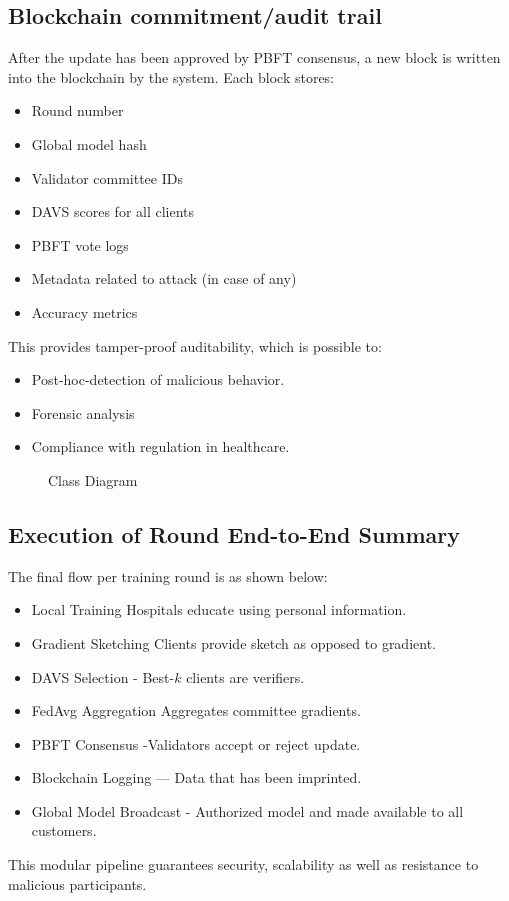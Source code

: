 \documentclass[12pt,a4paper]{article}
\begin{document}
\subsection{Blockchain commitment/audit trail}
After the update has been approved by PBFT consensus, a new block is written into the blockchain by the system.
Each block stores:
\begin{itemize}
    \item Round number
    \item Global model hash
    \item Validator committee IDs
    \item DAVS scores for all clients
    \item PBFT vote logs
    \item Metadata related to attack (in case of any)
    \item Accuracy metrics
\end{itemize}
This provides tamper-proof auditability, which is possible to:
\begin{itemize}
    \item Post-hoc-detection of malicious behavior.
    \item Forensic analysis
    \item Compliance with regulation in healthcare.
\end{itemize}

\begin{figure}[h]
    \centering
    \fbox{\rule{0pt}{2in} \rule{0.9\linewidth}{0pt}}
    \caption{Class Diagram}
\end{figure}

\subsection{Execution of Round End-to-End Summary}
The final flow per training round is as shown below:
\begin{itemize}
    \item Local Training Hospitals educate using personal information.
    \item Gradient Sketching Clients provide sketch as opposed to gradient.
    \item DAVS Selection - Best-$k$ clients are verifiers.
    \item FedAvg Aggregation Aggregates committee gradients.
    \item PBFT Consensus -Validators accept or reject update.
    \item Blockchain Logging --- Data that has been imprinted.
    \item Global Model Broadcast - Authorized model and made available to all customers.
\end{itemize}
This modular pipeline guarantees security, scalability as well as resistance to malicious participants.
\end{document}
